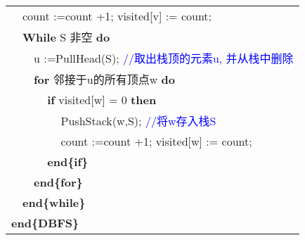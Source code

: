 \begin{solution}
\begin{table}[!htb]
\begin{tabular}{llllll}
 & \multicolumn{5}{l}{count :=count +1; visited[v] := count;} \\
 & \multicolumn{5}{l}{\textbf{While}  S 非空 \textbf{do}} \\
 &  & \multicolumn{4}{l}{u :=PullHead(S); \textcolor{blue}{//取出栈顶的元素u, 并从栈中删除}} \\
 &  & \multicolumn{4}{l}{\textbf{for} 邻接于u的所有顶点w  \textbf{do}} \\
 &  &  & \multicolumn{3}{l}{\textbf{if}  visited[w] = 0 \textbf{then}} \\
 &  &  &  & \multicolumn{2}{l}{PushStack(w,S); \textcolor{blue}{//将w存入栈S}} \\
 &  &  &  & \multicolumn{2}{l}{ count :=count +1; visited[w] := count;} \\
 &  &  & \multicolumn{3}{l}{\textbf{end\{if\}}} \\
 &  & \multicolumn{4}{l}{\textbf{end\{for\}}} \\
 & \multicolumn{5}{l}{\textbf{end\{while\}}} \\
\multicolumn{6}{l}{\textbf{end\{DBFS\}}} \\
\hline
\end{tabular}
\end{table}
\end{solution}
